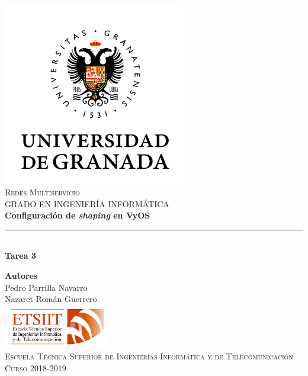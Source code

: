 \documentclass[11pt,a4paper]{article}
\begin{document}
\begin{titlepage}

\begin{minipage}{\textwidth}

\centering
\includegraphics[width=0.6\textwidth]{img/logo.png}\\

\textsc{\Large Redes Multiservicio\\[0.2cm]}
\textsc{GRADO EN INGENIERÍA INFORMÁTICA}\\[1cm]

{\Huge\bfseries Configuración de \textit{shaping} en VyOS\\}
\noindent\rule[-1ex]{\textwidth}{3pt}\\[3.5ex]
{\large\bfseries Tarea 3}
\end{minipage}

\vspace{1cm}
\begin{minipage}{\textwidth}
\centering

\textbf{Autores}\\ {Pedro Parrilla Navarro\\ Nazaret Román Guerrero}\\[2.5ex]
\includegraphics[width=0.35\textwidth]{img/etsiit.jpeg}\\[0.1cm]
\vspace{0.5cm}
\textsc{Escuela Técnica Superior de Ingenierías Informática y de Telecomunicación}\\
\vspace{0.5cm}
\textsc{Curso 2018-2019}
\end{minipage}
\end{titlepage}
\end{document}
